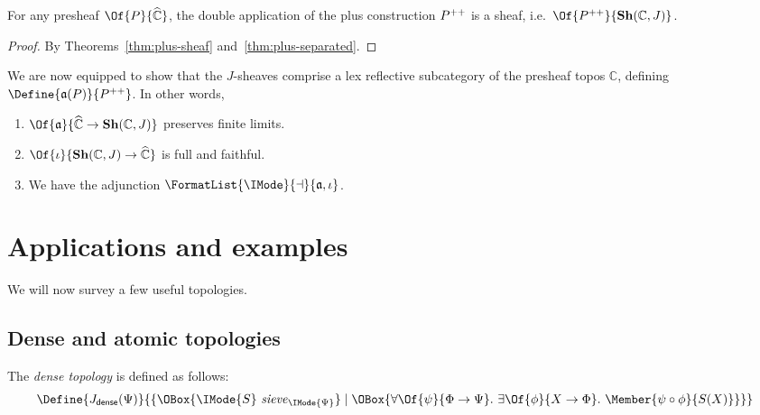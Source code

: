 \documentclass{article}
\newcommand\Psh[1]{\widehat{#1}}
\newcommand\Sh[1]{\mathbf{Sh} (#1)}
\newcommand\IsSieve[2]{\IMode{#2}\ \mathit{sieve}_{\IMode{#1}}}
\newcommand\JDense{J_{\mathsf{dense}}}
\DeclareMathOperator{\Sheafify}{\mathfrak{a}}
\newcommand\AreAdjoint[1]{\FormatList{\IMode}{\dashv}{#1}}
\begin{document}
\begin{cor}
  For any presheaf $\Of{P}{\Psh{\mathbb{C}}}$, the double application
  of the plus construction ${P}^{++}$ is a sheaf, i.e.\
  $\Of{\PlusPlus{P}}{\Sh{\mathbb{C},J}}$.
\end{cor}
\begin{proof}
  By Theorems~\ref{thm:plus-sheaf} and~\ref{thm:plus-separated}.
\end{proof}



\begin{thm}[Sheafification]
  We are now equipped to show that the $J$-sheaves comprise a lex
  reflective subcategory of the presheaf topos $\mathbb{C}$, defining
  $\Define{\Sheafify(P)}{\PlusPlus{P}}$. In other words,
  \begin{enumerate}
  \item $\Of{\Sheafify}{\Psh{\mathbb{C}}\to\Sh{\mathbb{C},J}}$
    preserves finite limits.
  \item $\Of{\iota}{\Sh{\mathbb{C},J}\to\Psh{\mathbb{C}}}$ is full and
    faithful.
  \item We have the adjunction $\AreAdjoint{\Sheafify,\iota}$.
  \end{enumerate}
\end{thm}



\newpage
\section{Applications and examples}

We will now survey a few useful topologies.

\subsection{Dense and atomic topologies}

\begin{definition}
  The \emph{dense topology} is defined as follows:
  \[
    \Define{
      \JDense(\Psi)
    }{
      \MkSet{
        \OBox{
          \IsSieve{\Psi}{S}
        }
        \mid
        \OBox{
          \forall\Of{\psi}{\Phi\to\Psi}.\
          \exists\Of{\phi}{X\to\Phi}.\
          \Member{\psi\circ \phi}{S(X)}
        }
      }
    }
  \]
\end{definition}
\end{document}
